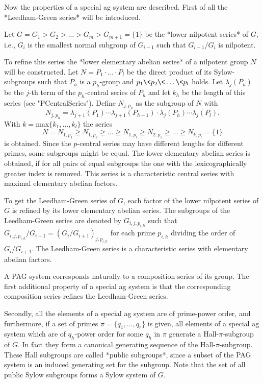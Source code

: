 Now the properties of a special ag system are described.
First of all the *Leedham-Green series* will be introduced.

Let $G = G_1 > G_2 > \ldots > G_m > G_{m+1} = \{ 1 \}$ be the *lower
nilpotent series* of $G$, i.e., $G_i$ is the smallest normal subgroup of
$G_{i-1}$ such that $G_{i-1} / G_i$ is nilpotent.

To refine this series the *lower elementary abelian series* of a
nilpotent group $N$ will be constructed.
Let $N = P_1 \cdot \ldots \cdot P_l$ be the direct product of its
Sylow-subgroups such that $P_h$ is a $p_h$-group and
$p_1 \< p_2 \< \ldots \< p_l$ holds.  Let $\lambda_{j}(P_h)$ be the
$j$-th term of the $p_h$-central series of $P_h$ and let $k_h$ be the
length of this series (see "PCentralSeries").
Define $N_{j, p_h}$ as the subgroup of $N$ with
$$
  N_{j, p_h} = \lambda_{j+1}(P_1) \cdots \lambda_{j+1}(P_{h-1}) \cdot
               \lambda_j(P_h) \cdots \lambda_j(P_l).
$$
With $k = $max$\{k_1, \ldots, k_l\}$ the series
$$
  N = N_{1, p_1} \geq N_{1, p_2} \geq \ldots \geq N_{1,p_l}
      \geq N_{2, p_1} \geq \ldots \geq N_{k, p_l} = \{ 1 \}
$$
is obtained. Since the $p$-central series may have different lengths for
different primes, some subgroups might be equal.  The lower elementary
abelian series is obtained, if for all pairs of equal subgroups the one
with the lexicographically greater index is removed.  This series is a
characteristic central series with maximal elementary abelian factors.

To get the Leedham-Green series of $G$, each factor of the lower
nilpotent series of $G$ is refined by its lower elementary abelian
series. The subgroups of the Leedham-Green series are denoted by
$G_{i, j, p_{i, h}}$ such that $G_{i, j, p_{i, h}} / G_{i+1} =
(G_i / G_{i+1})_{j, p_{i,h}}$ for each prime $p_{i,h}$ dividing the order
of $G_i / G_{i+1}$.  The Leedham-Green series is a characteristic series
with elementary abelian factors.

A PAG system corresponds naturally to a composition series of its group.
The first additional property of a special ag system is that the
corresponding composition series refines the Leedham-Green series.

Secondly, all the elements of a special ag system are of prime-power
order, and furthermore, if a set of primes $\pi = \{q_1, \ldots, q_r\}$
is given, all elements of a special ag system which are of $q_h$-power
order for some $q_h$ in $\pi$ generate a Hall-$\pi$-subgroup of $G$. In
fact they form a canonical generating sequence of the
Hall-$\pi$-subgroup.  These Hall subgroups are called *public subgroups*,
since a subset of the PAG system is an induced generating set for the
subgroup. Note that the set of all public Sylow subgroups forms a Sylow
system of $G$.


